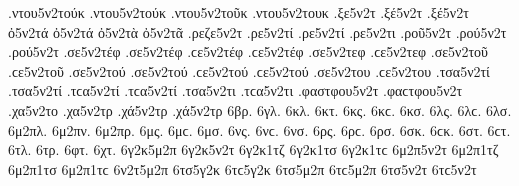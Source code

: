 {.ντου5ν2τούκ .ντου5ν2τούκ   %
.ντου5ν2τοῦκ 
.ντου5ν2τουκ 
.ξε5ν2τ   %
.ξέ5ν2τ .ξέ5ν2τ 
ὀ5ν2τά ὀ5ν2τά   %
ὀ5ν2τὰ 
ὀ5ν2τᾶ 
.ρεζε5ν2τ   %
.ρε5ν2τί .ρε5ν2τί   %
.ρε5ν2τι 
.ροῦ5ν2τ   %
.ρού5ν2τ .ρού5ν2τ 
.σε5ν2τέφ .σε5ν2τέφ .ϲε5ν2τέφ .ϲε5ν2τέφ   %
.σε5ν2τεφ .ϲε5ν2τεφ 
.σε5ν2τοῦ .ϲε5ν2τοῦ   %
.σε5ν2τού .σε5ν2τού .ϲε5ν2τού .ϲε5ν2τού 
.σε5ν2του .ϲε5ν2του 
.τσα5ν2τί .τσα5ν2τί .τϲα5ν2τί .τϲα5ν2τί   %
.τσα5ν2τι .τϲα5ν2τι 
.φαστφου5ν2τ .φαϲτφου5ν2τ   %
.χα5ν2το   %
.χα5ν2τρ   %
.χά5ν2τρ .χά5ν2τρ 
6βρ.   %
6γλ.   %
6κλ.   %
6κτ.   %
6κς. 6κϲ.   %
6κσ. 
6λς. 6λϲ.   %
6λσ. 
6μ2πλ.   %
6μ2πν.   %
6μ2πρ.   %
6μς. 6μϲ.   %
6μσ. 
6νς. 6νϲ.   %
6νσ. 
6ρς. 6ρϲ.   %
6ρσ. 
6σκ. 6ϲκ.   %
6στ. 6ϲτ.   %
6τλ.   %
6τρ.   %
6φτ.   %
6χτ.   %
6γ2κ5μ2π 
6γ2κ5ν2τ 
6γ2κ1τζ 
6γ2κ1τσ 6γ2κ1τϲ 
6μ2π5ν2τ 
6μ2π1τζ 
6μ2π1τσ 6μ2π1τϲ 
6ν2τ5μ2π 
6τσ5γ2κ 6τϲ5γ2κ 
6τσ5μ2π 6τϲ5μ2π 
6τσ5ν2τ 6τϲ5ν2τ 
}
